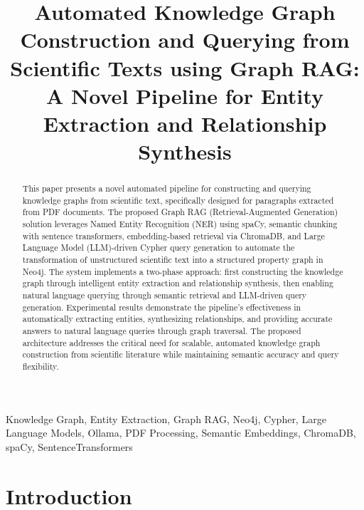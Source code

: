 \documentclass[conference]{IEEEtran}
\begin{document}
\title{Automated Knowledge Graph Construction and Querying from Scientific Texts using Graph RAG: A Novel Pipeline for Entity Extraction and Relationship Synthesis}

\author{
}

\maketitle

\begin{abstract}
This paper presents a novel automated pipeline for constructing and querying knowledge graphs from scientific text, specifically designed for paragraphs extracted from PDF documents. The proposed Graph RAG (Retrieval-Augmented Generation) solution leverages Named Entity Recognition (NER) using spaCy, semantic chunking with sentence transformers, embedding-based retrieval via ChromaDB, and Large Language Model (LLM)-driven Cypher query generation to automate the transformation of unstructured scientific text into a structured property graph in Neo4j. The system implements a two-phase approach: first constructing the knowledge graph through intelligent entity extraction and relationship synthesis, then enabling natural language querying through semantic retrieval and LLM-driven query generation. Experimental results demonstrate the pipeline's effectiveness in automatically extracting entities, synthesizing relationships, and providing accurate answers to natural language queries through graph traversal. The proposed architecture addresses the critical need for scalable, automated knowledge graph construction from scientific literature while maintaining semantic accuracy and query flexibility.
\end{abstract}

\begin{IEEEkeywords}
Knowledge Graph, Entity Extraction, Graph RAG, Neo4j, Cypher, Large Language Models, Ollama, PDF Processing, Semantic Embeddings, ChromaDB, spaCy, SentenceTransformers
\end{IEEEkeywords}

\section{Introduction}
\end{document}
